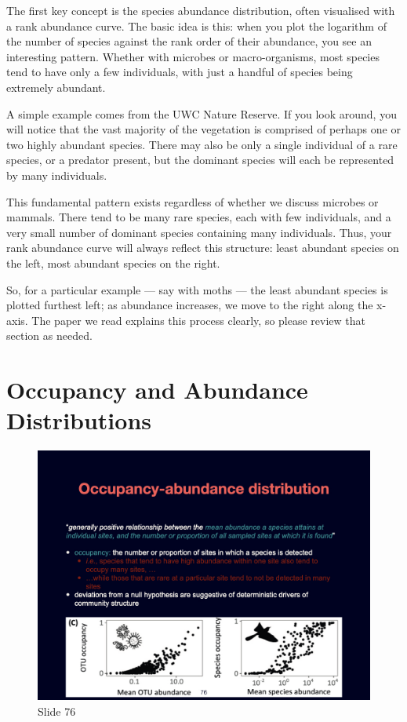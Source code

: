 \documentclass[
  12pt,
]{book}
\begin{document}
The first key concept is the species abundance distribution, often
visualised with a rank abundance curve. The basic idea is this: when you
plot the logarithm of the number of species against the rank order of
their abundance, you see an interesting pattern. Whether with microbes
or macro-organisms, most species tend to have only a few individuals,
with just a handful of species being extremely abundant.

A simple example comes from the UWC Nature Reserve. If you look around,
you will notice that the vast majority of the vegetation is comprised of
perhaps one or two highly abundant species. There may also be only a
single individual of a rare species, or a predator present, but the
dominant species will each be represented by many individuals.

This fundamental pattern exists regardless of whether we discuss
microbes or mammals. There tend to be many rare species, each with few
individuals, and a very small number of dominant species containing many
individuals. Thus, your rank abundance curve will always reflect this
structure: least abundant species on the left, most abundant species on
the right.

So, for a particular example --- say with moths --- the least abundant
species is plotted furthest left; as abundance increases, we move to the
right along the x-axis. The paper we read explains this process clearly,
so please review that section as needed.

\section{Occupancy and Abundance
Distributions}\label{occupancy-and-abundance-distributions}

\begin{figure}[ht]
\centering
\includegraphics[width=0.8\linewidth]{../images/BDC334/BDC334-076.jpeg}
\caption*{Slide 76}
\end{figure}
\end{document}
